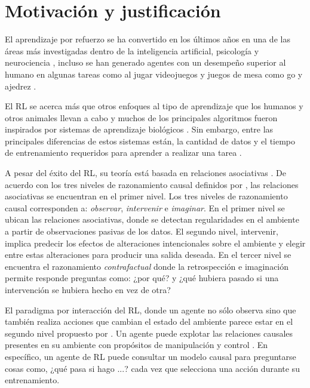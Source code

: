 \section{Motivación y justificación}


El aprendizaje por refuerzo se ha convertido en los últimos años en una de las áreas
más investigadas dentro de la inteligencia artificial, psicología y neurociencia \cite{botvinick2019reinforcement}, incluso
se han generado agentes con un desempeño superior al humano en algunas tareas como  al jugar videojuegos \cite{mnih2015human, starcraft2019deepmind} y juegos de mesa como go y ajedrez \cite{Silver1140}.

El RL se acerca más que otros enfoques al tipo de aprendizaje que los humanos y otros
animales llevan a cabo y muchos de los principales algoritmos fueron inspirados por 
sistemas de aprendizaje biológicos \cite{sutton_barto_2018}. Sin embargo,
entre las principales diferencias de estos sistemas 
están, la cantidad de datos y el tiempo de entrenamiento
requeridos para aprender a realizar una tarea \cite{Silver1140}.

A pesar del éxito del RL, su teoría está basada 
en relaciones asociativas \cite{playingagainstnature2018}.
De acuerdo con los tres niveles
de razonamiento causal definidos por \cite{pearl2018bookofwhy}, las 
relaciones asociativas se encuentran en el primer nivel.
Los tres niveles de razonamiento causal corresponden a: \textit{observar}, \textit{intervenir}
e \textit{imaginar}.
En el primer nivel se ubican las 
relaciones asociativas, donde se detectan regularidades
en el ambiente a partir de observaciones pasivas de los datos.
El segundo nivel, intervenir, implica predecir los 
efectos de alteraciones intencionales sobre el ambiente
y elegir entre estas alteraciones  para producir una
salida deseada. En el tercer nivel se encuentra
el razonamiento \textit{contrafactual} donde la retrospección
e imaginación permite responde preguntas como: ¿por qué?
y ¿qué hubiera pasado si una intervención se hubiera hecho 
en vez de otra?

El paradigma por interacción del RL, donde un agente
no sólo observa sino que también realiza acciones que 
cambian el estado del ambiente parece estar 
en el segundo nivel propuesto por \cite{pearl2018bookofwhy}.
Un agente puede explotar las relaciones causales presentes
en su ambiente con propósitos de manipulación y control \cite{woodward2005making}.
En específico, un agente de RL puede consultar un modelo
causal para preguntarse cosas como, ¿qué pasa si hago ...?
cada vez que selecciona una acción durante su entrenamiento.

